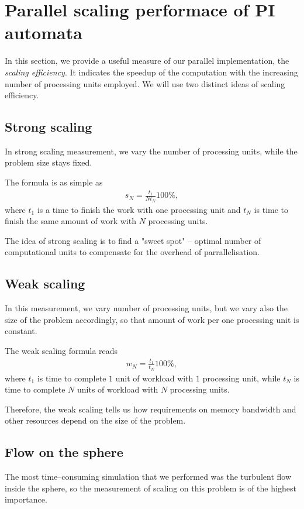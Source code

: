 \chapter{Parallel scaling performace of PI automata}
In this section, we provide a useful measure of our parallel implementation, the \textit{scaling efficiency}. It indicates the speedup of the computation with the increasing number of processing units employed.
We will use two distinct ideas of scaling efficiency.

\section{Strong scaling}
In strong scaling measurement, we vary the number of processing units, while the problem size stays fixed.

The formula is as simple as
\begin{align*}
s_N = \frac{t_1}{N t_N} 100\%,
\end{align*}
where $t_1$ is a time to finish the work with one processing unit and $t_N$ is time to finish the same amount of work with $N$ processing units.

The idea of strong scaling is to find a "sweet spot" -- optimal number of computational units to compensate for the overhead of parrallelisation.
\section{Weak scaling}
In this measurement, we vary number of processing units, but we vary also the size of the problem accordingly, so that amount of work per one processing unit is constant.

The weak scaling formula reads
\begin{align*}
w_N = \frac{t_1}{t_N} 100\%,
\end{align*}
where $t_1$ is time to complete $1$ unit of workload with $1$ processing unit, while $t_N$ is time to complete $N$ units of workload with $N$ processing units.

Therefore, the weak scaling tells us how requirements on memory bandwidth and other resources depend on the size of the problem.

\section{Flow on the sphere}
The most time--consuming simulation that we performed was the turbulent flow inside the sphere, so the measurement of scaling on this problem is of the highest importance.

